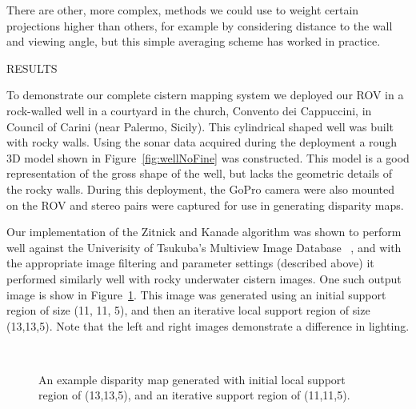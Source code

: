 \documentclass[twocolumn]{article}
\makeatletter
\def\section{\@startsection{section}{1}{\z@}{24pt plus 2 pt
minus 2 pt} {12pt plus 2pt minus 2pt}{\large\bf}}
\makeatother
\begin{document}
There are other, more complex, methods we could use to weight certain projections higher than others, for example by considering distance to the wall and viewing angle, but this simple averaging scheme has worked in practice. 

\section{\uppercase{Results}}
\label{sec:results}

To demonstrate our complete cistern mapping system we deployed our ROV in a rock-walled well in a courtyard in the church, Convento dei Cappuccini, in Council of Carini (near Palermo, Sicily).
This cylindrical shaped well was built with rocky walls.  Using the sonar data acquired during the deployment a rough 3D model shown in Figure~\ref{fig:wellNoFine} was constructed.  This model is a good representation of the gross shape of the well, but lacks the geometric details of the rocky walls.  During this deployment, the GoPro camera were also mounted on the ROV and stereo pairs were captured for use in generating disparity maps.

Our implementation of the Zitnick and Kanade algorithm was shown to perform well against the Univerisity of Tsukuba's Multiview Image Database ~\cite{stereo:zitKan}, and with the appropriate image filtering and parameter settings (described above) it performed similarly well with rocky underwater cistern images.
One such output image is show in Figure~\ref{fig:disparity}.
This image was generated using an initial support region of size (11, 11, 5), and then an iterative local support region of size (13,13,5).
Note that the left and right images demonstrate a difference in lighting.

\begin{figure}[!h]
	\centering
		\quad %
		\\%
		\medskip
		\caption{An example disparity map generated with initial local support region of (13,13,5), and an iterative support region of (11,11,5).}
		\label{fig:disparity}
\end{figure}
\end{document}
